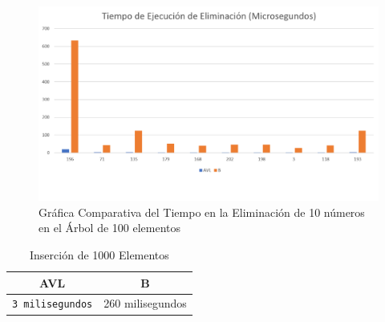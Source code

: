 \documentclass[acmsmall]{acmart}
\begin{document}
\begin{figure}[h]
  \centering
  \caption{Gráfica Comparativa del Tiempo en la Eliminación de 10 números en el Árbol de 100 elementos}

  \includegraphics[angle=0,scale=0.5]{100.3 elem.png}
  
\end{figure}



\begin{table}[htbp]
\begin{center}
  \caption{Inserción de 1000 Elementos}
  \begin{tabular}{cc}
    \toprule
    AVL & B\\
    \midrule
    \texttt{3 milisegundos} & 260 milisegundos \\
    \bottomrule
  \end{tabular}
  \end{center}
\end{table}

\clearpage
\end{document}
